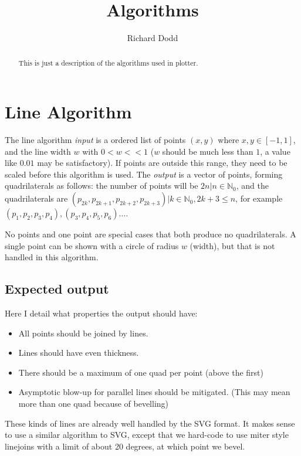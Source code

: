 \documentclass[]{article}
\title{Algorithms}
\author{Richard Dodd}
\begin{document}
\maketitle

\begin{abstract}
This is just a description of the algorithms used in plotter.
\end{abstract}

\section{Line Algorithm}
The line algorithm \emph{input} is a ordered list of points $(x, y)$ where $x, y \in [-1, 1]$, and the line width $w$ with $0 < w << 1$ ($w$ should be much less than $1$, a value like $0.01$ may be satisfactory). If points are outside this range, they need to be scaled before this algorithm is used. The \emph{output} is a vector of points, forming quadrilaterals as follows: the number of points will be $2n| n \in \mathbb{N}_0$, and the quadrilaterals are $(p_{2k}, p_{2k+1}, p_{2k+2}, p_{2k+3}) | k \in \mathbb{N}_0, 2k+3 \le n$, for example $(p_1, p_2, p_3, p_4), (p_3, p_4, p_5, p_6) \dots$.

No points and one point are special cases that both produce no quadrilaterals. A single point can be shown with a circle of radius $w$ (width), but that is not handled in this algorithm.

\subsection{Expected output}
Here I detail what properties the output should have:
\begin{itemize}
	\item All points should be joined by lines.
	\item Lines should have even thickness.
	\item There should be a maximum of one quad per point (above the first)
	\item Asymptotic blow-up for parallel lines should be mitigated. (This may mean more than one quad because of bevelling)
\end{itemize}

These kinds of lines are already well handled by the SVG format. It makes sense to use a similar algorithm to SVG, except that we hard-code to use miter style linejoins \cite{stroke-linejoin} with a limit \cite{stroke-miterlimit} of about 20 degrees, at which point we bevel.
\end{document}
